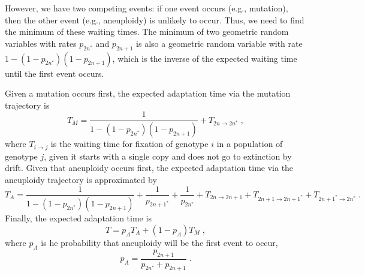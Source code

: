 \documentclass[12pt]{extarticle}
\newcommand{\anwt}{\emph{2n+1}}
\newcommand{\eumt}{\emph{2n*}}
\newcommand{\anmt}{\emph{2n+1*}}
\begin{document}
However, we have two competing events: if one event occurs (e.g., mutation), then the other event (e.g., aneuploidy) is unlikely to occur. Thus, we need to find the minimum of these waiting times. The minimum of two geometric random variables with rates $p_{2n^*}$ and $p_{2n+1}$ is also a geometric random variable with rate $1-(1-p_{2n^*})(1-p_{2n+1})$, which is the inverse of the expected waiting time until the first event occurs.


Given a mutation occurs first, %
the expected adaptation time via the mutation trajectory is 
\begin{equation}\label{eq:T_mut}
T_{M}=\frac{1}{1-(1-p_{2n^*})(1-p_{2n+1})} + T_{2n \to 2n^*} \;,
\end{equation}
where $T_{i \to j}$ is the waiting time for fixation of genotype $i$ in a population of genotype $j$, given it starts with a single copy and does not go to extinction by drift.
Given that aneuploidy occurs first, %
the expected adaptation time via the aneuploidy trajectory is approximated by
\begin{equation}\label{eq:T_aneu} 
 T_A = \frac{1}{1-(1-p_{2n^*})(1-p_{2n+1})} + \frac{1}{p_{2n+1^*}} + \frac{1}{p_{2n^*}} + T_{2n \to 2n+1} + T_{2n+1 \to 2n+1^*} + T_{2n+1^* \to 2n^*} \;.
 \end{equation} %
Finally, the expected adaptation time is 
 \begin{equation}\label{eq:T_total}
 T = p_A T_{A}+(1-p_A) T_{M} \;,
 \end{equation}
 where $p_A$ is he probability that aneuploidy will be the first event to occur,
\begin{equation}
p_A = \frac{p_{2n+1}}{p_{2n^*}+p_{2n+1}} \;.
\end{equation}
\end{document}
